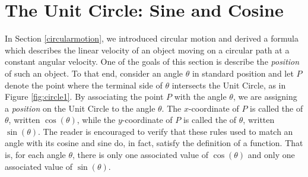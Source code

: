 \section{The Unit Circle: Sine and Cosine}

\label{TheUnitCircle}

In Section \ref{circularmotion}, we introduced circular motion and derived a formula which describes the linear velocity of an object moving on a circular path at a constant angular velocity.  One of the goals of this section is describe the \textit{position} of such an object.  To that end, consider an angle $\theta$ in standard position and let $P$ denote the point where the terminal side of $\theta$ intersects the Unit Circle, as in Figure \ref{fig:circle1}.  By associating the point $P$ with the angle $\theta$, we are assigning a \emph{position} on the Unit Circle to the angle $\theta$.  The $x$-coordinate of $P$ is called the   of $\theta$, written $\cos(\theta)$, while the $y$-coordinate of $P$ is called the   of $\theta$, written $\sin(\theta)$.  The reader is encouraged to verify that these rules used to match an angle with its cosine and sine do, in fact, satisfy the definition of a function.  That is, for each angle $\theta$, there is only one associated value of $\cos(\theta)$ and only one associated value of $\sin(\theta)$.  




\medskip

